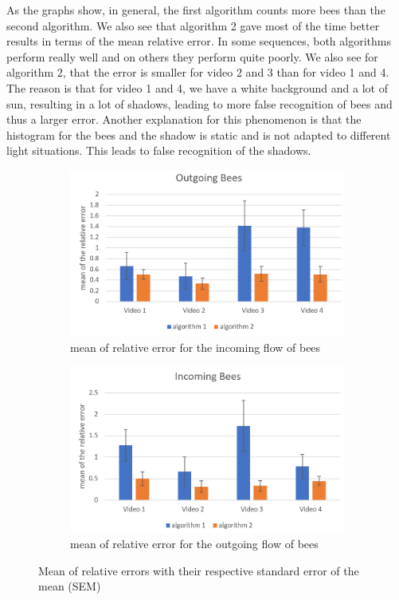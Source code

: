 \documentclass[10pt,twocolumn,letterpaper]{article}
\begin{document}
As the graphs show, in general, the first algorithm counts more bees than the second algorithm. We also see that algorithm 2 gave most of the time better results in terms of the mean relative error. In some sequences, both algorithms perform really well and on others they perform quite poorly. We also see for algorithm 2, that the error is smaller for video 2 and 3 than for video 1 and 4. The reason is that for video 1 and 4, we have a white background and a lot of sun, resulting in a lot of shadows, leading to more false recognition of bees and thus a larger error. Another explanation for this phenomenon is that the histogram for the bees and the shadow is static and is not adapted to different light situations. This leads to false recognition of the shadows.

\begin{figure}[h!]
\centering
\begin{subfigure}[b]{0.5\textwidth}
        \includegraphics[width=\textwidth]{graphs/graph1.jpg}
        \caption{mean of relative error for the incoming flow of bees}
        \label{fig:meanRelative_1}
    \end{subfigure}
    \begin{subfigure}[b]{0.5\textwidth}
        \includegraphics[width=\textwidth]{graphs/graph2.jpg}
        \caption{mean of relative error for the outgoing flow of bees}
        \label{fig:meanRelative_2}
    \end{subfigure}
\caption{Mean of relative errors with their respective standard error of the mean (SEM)}
\label{fig:meanRelative}
\end{figure}
\end{document}
